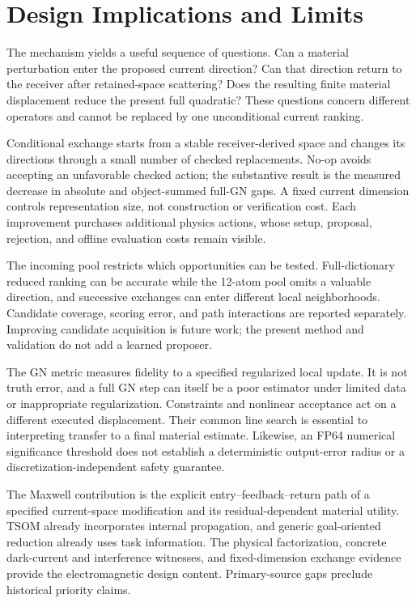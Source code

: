 \section{Design Implications and Limits}
The mechanism yields a useful sequence of questions. Can a material perturbation enter the proposed current direction? Can that direction return to the receiver after retained-space scattering? Does the resulting finite material displacement reduce the present full quadratic? These questions concern different operators and cannot be replaced by one unconditional current ranking.

Conditional exchange starts from a stable receiver-derived space and changes its directions through a small number of checked replacements. No-op avoids accepting an unfavorable checked action; the substantive result is the measured decrease in absolute and object-summed full-GN gaps. A fixed current dimension controls representation size, not construction or verification cost. Each improvement purchases additional physics actions, whose setup, proposal, rejection, and offline evaluation costs remain visible.

The incoming pool restricts which opportunities can be tested. Full-dictionary reduced ranking can be accurate while the 12-atom pool omits a valuable direction, and successive exchanges can enter different local neighborhoods. Candidate coverage, scoring error, and path interactions are reported separately. Improving candidate acquisition is future work; the present method and validation do not add a learned proposer.

The GN metric measures fidelity to a specified regularized local update. It is not truth error, and a full GN step can itself be a poor estimator under limited data or inappropriate regularization. Constraints and nonlinear acceptance act on a different executed displacement. Their common line search is essential to interpreting transfer to a final material estimate. Likewise, an FP64 numerical significance threshold does not establish a deterministic output-error radius or a discretization-independent safety guarantee.

The Maxwell contribution is the explicit entry--feedback--return path of a specified current-space modification and its residual-dependent material utility. TSOM already incorporates internal propagation, and generic goal-oriented reduction already uses task information. The physical factorization, concrete dark-current and interference witnesses, and fixed-dimension exchange evidence provide the electromagnetic design content. Primary-source gaps preclude historical priority claims.


